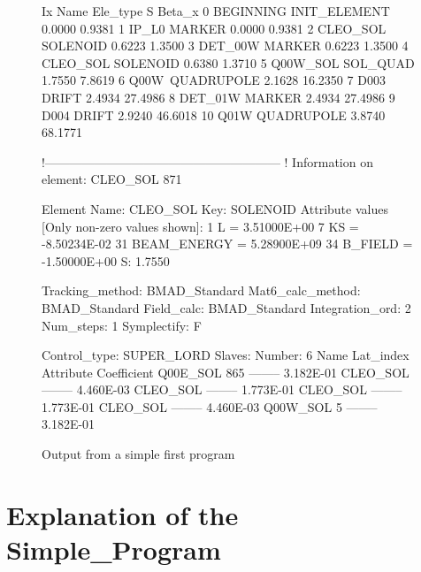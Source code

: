 \begin{figure}
\begin{listing}{1}
  Ix  Name              Ele_type                   S      Beta_x
   0  BEGINNING         INIT_ELEMENT          0.0000      0.9381
   1  IP_L0             MARKER                0.0000      0.9381
   2  CLEO_SOL\3        SOLENOID              0.6223      1.3500
   3  DET_00W           MARKER                0.6223      1.3500
   4  CLEO_SOL\4        SOLENOID              0.6380      1.3710
   5  Q00W\CLEO_SOL     SOL_QUAD              1.7550      7.8619
   6  Q00W\             QUADRUPOLE            2.1628     16.2350
   7  D003              DRIFT                 2.4934     27.4986
   8  DET_01W           MARKER                2.4934     27.4986
   9  D004              DRIFT                 2.9240     46.6018
  10  Q01W              QUADRUPOLE            3.8740     68.1771

 !---------------------------------------------------------
 ! Information on element: CLEO_SOL 871

  Element Name: CLEO_SOL
  Key: SOLENOID
  Attribute values [Only non-zero values shown]:
      1   L                =  3.51000E+00
      7   KS               = -8.50234E-02
     31   BEAM_ENERGY      =  5.28900E+09
     34   B_FIELD          = -1.50000E+00
  S:       1.7550

  Tracking_method:  BMAD_Standard
  Mat6_calc_method: BMAD_Standard
  Field_calc:       BMAD_Standard
  Integration_ord:    2
  Num_steps:          1
  Symplectify:        F

  Control_type: SUPER_LORD
  Slaves: Number:   6
      Name             Lat_index  Attribute       Coefficient
      Q00E\CLEO_SOL          865  --------          3.182E-01
      CLEO_SOL  --------          4.460E-03
      CLEO_SOL  --------          1.773E-01
      CLEO_SOL  --------          1.773E-01
      CLEO_SOL  --------          4.460E-03
      Q00W\CLEO_SOL            5  --------          3.182E-01
\end{listing}
\caption{Output from a simple first program}
\label{f:output}
\end{figure}

\section{Explanation of the Simple\_Program}

